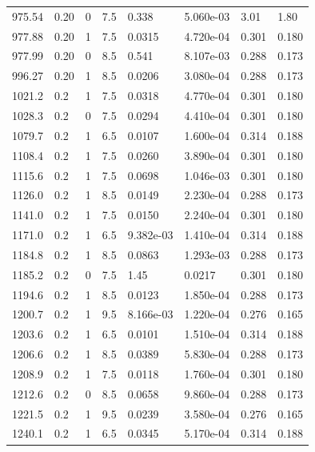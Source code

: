 \documentclass[preview]{standalone}
\begin{document}
{{{\begin{tabular}{L{1.2cm}C{1.2cm} C{0.3cm}C{0.5cm} C{1.4cm}C{1.4cm} C{1.4cm}C{1.4cm}}
  975.54  &  0.20  & 0     & 7.5 &  0.338  & 5.060e-03  & 3.01 &  1.80   \\ 
  977.88  &  0.20  & 1     & 7.5 &  0.0315  & 4.720e-04  & 0.301 &  0.180   \\ 
  977.99  &  0.20  & 0     & 8.5 &  0.541  & 8.107e-03  & 0.288 &  0.173   \\ 
  996.27  &  0.20  & 1     & 8.5 &  0.0206  & 3.080e-04  & 0.288 &  0.173   \\ 
  1021.2  &   0.2  & 1     & 7.5 &  0.0318  & 4.770e-04  & 0.301 &  0.180   \\ 
  1028.3  &   0.2  & 0     & 7.5 &  0.0294  & 4.410e-04  & 0.301 &  0.180   \\ 
  1079.7  &   0.2  & 1     & 6.5 &  0.0107  & 1.600e-04  & 0.314 &  0.188   \\ 
  1108.4  &   0.2  & 1     & 7.5 &  0.0260  & 3.890e-04  & 0.301 &  0.180   \\ 
  1115.6  &   0.2  & 1     & 7.5 &  0.0698  & 1.046e-03  & 0.301 &  0.180   \\ 
  1126.0  &   0.2  & 1     & 8.5 &  0.0149  & 2.230e-04  & 0.288 &  0.173   \\ 
  1141.0  &   0.2  & 1     & 7.5 &  0.0150  & 2.240e-04  & 0.301 &  0.180   \\ 
  1171.0  &   0.2  & 1     & 6.5 &  9.382e-03  & 1.410e-04  & 0.314 &  0.188   \\ 
  1184.8  &   0.2  & 1     & 8.5 &  0.0863  & 1.293e-03  & 0.288 &  0.173   \\ 
  1185.2  &   0.2  & 0     & 7.5 &  1.45  & 0.0217  & 0.301 &  0.180   \\ 
  1194.6  &   0.2  & 1     & 8.5 &  0.0123  & 1.850e-04  & 0.288 &  0.173   \\ 
  1200.7  &   0.2  & 1     & 9.5 &  8.166e-03  & 1.220e-04  & 0.276 &  0.165   \\ 
  1203.6  &   0.2  & 1     & 6.5 &  0.0101  & 1.510e-04  & 0.314 &  0.188   \\ 
  1206.6  &   0.2  & 1     & 8.5 &  0.0389  & 5.830e-04  & 0.288 &  0.173   \\ 
  1208.9  &   0.2  & 1     & 7.5 &  0.0118  & 1.760e-04  & 0.301 &  0.180   \\ 
  1212.6  &   0.2  & 0     & 8.5 &  0.0658  & 9.860e-04  & 0.288 &  0.173   \\ 
  1221.5  &   0.2  & 1     & 9.5 &  0.0239  & 3.580e-04  & 0.276 &  0.165   \\ 
  1240.1  &   0.2  & 1     & 6.5 &  0.0345  & 5.170e-04  & 0.314 &  0.188   \\ 

\end{tabular}}}}
\end{document}
